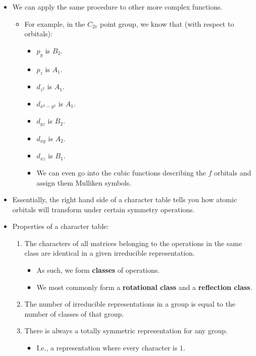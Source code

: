 \documentclass[../notes.tex]{subfiles}
\begin{document}
\begin{itemize}
\begin{itemize}
    \end{itemize}
    \item We can apply the same procedure to other more complex functions.
    \begin{itemize}
        \item For example, in the $C_{2v}$ point group, we know that (with respect to orbitals):
        \begin{itemize}
            \item $p_y$ is $B_2$.
            \item $p_z$ is $A_1$.
            \item $d_{z^2}$ is $A_1$.
            \item $d_{x^2-y^2}$ is $A_1$.
            \item $d_{yz}$ is $B_2$.
            \item $d_{xy}$ is $A_2$.
            \item $d_{xz}$ is $B_1$.
            \item We can even go into the cubic functions describing the $f$ orbitals and assign them Mulliken symbols.
        \end{itemize}
    \end{itemize}
    \item Essentially, the right hand side of a character table tells you how atomic orbitals will transform under certain symmetry operations.
    \item Properties of a character table:
    \begin{enumerate}
        \item The characters of all matrices belonging to the operations in the same class are identical in a given irreducible representation.
        \begin{itemize}
            \item As such, we form \textbf{classes} of operations.
            \item We most commonly form a \textbf{rotational class} and a \textbf{reflection class}.
        \end{itemize}
        \item The number of irreducible representations in a group is equal to the number of classes of that group.
        \item There is always a totally symmetric representation for any group.
        \begin{itemize}
            \item I.e., a representation where every character is $1$.
        \end{itemize}

\end{enumerate}
\end{itemize}
\end{document}
